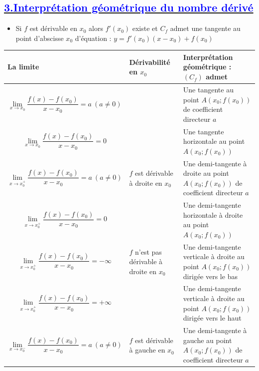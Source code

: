 \documentclass{article}
\begin{document}
\subsection*{\underline{\textbf{\textcolor{blue}{3.Interprétation géométrique du nombre dérivé}}}}
\begin{itemize}
		\item[•] Si \( f \) est dérivable en \( x_{0} \) alors \( f'(x_{0}) \) existe et \( C_{f} \) admet une tangente au point d’abscisse \( x_{0} \) d'équation : \( y=f'(x_{0})(x-x_{0}) + f(x_{0}) \)
\end{itemize}
\begin{table}[H]
\centering
\renewcommand{\arraystretch}{1.5}
\begin{tabular}{|>{\centering\arraybackslash}m{5cm}|>{\centering\arraybackslash}m{3cm}|>{\centering\arraybackslash}m{6cm}|}
\hline
\textbf{La limite} & \textbf{Dérivabilité en \( x_0 \)} & \textbf{Interprétation géométrique : \( (C_f) \) admet} \\
\hline
\[\lim_{x \to x_0} \frac{f(x) - f(x_0)}{x - x_0} = a \ (a \neq 0)\] & \multirow{2}{*}{\(f\) est dérivable en \(x_0\)} & Une tangente au point \( A \left(x_0; f(x_0)\right) \) de coefficient directeur \(a\) \\
\cline{1-1} \cline{3-3}
\[\lim_{x \to x_0} \frac{f(x) - f(x_0)}{x - x_0} = 0 \] &  & Une tangente horizontale au point \( A \left(x_0; f(x_0)\right) \) \\
\hline
\[\lim_{x \to x_0^+} \frac{f(x) - f(x_0)}{x - x_0} = a \ (a \neq 0) \] & \(f\) est dérivable à droite en \(x_0\) & Une demi-tangente à droite au point \( A \left(x_0; f(x_0)\right) \) de coefficient directeur \(a\) \\
\cline{1-1} \cline{3-3} 
\[\lim_{x \to x_0^+} \frac{f(x) - f(x_0)}{x - x_0} = 0 \] &  & Une demi-tangente horizontale à droite au point \( A \left(x_0; f(x_0)\right) \) \\
\hline
\[\lim_{x \to x_0^+} \frac{f(x) - f(x_0)}{x - x_0} = -\infty \] & \(f\) n'est pas dérivable à droite en \(x_0\) & Une demi-tangente verticale à droite au point \( A \left(x_0; f(x_0)\right) \) dirigée vers le bas \\
\cline{1-1} \cline{3-3}
\[\lim_{x \to x_0^+} \frac{f(x) - f(x_0)}{x - x_0} = +\infty \] &  & Une demi-tangente verticale à droite au point \( A \left(x_0; f(x_0)\right) \) dirigée vers le haut \\
\hline
\[\lim_{x \to x_0^-} \frac{f(x) - f(x_0)}{x - x_0} = a \ (a \neq 0) \] & \(f\) est dérivable à gauche en \(x_0\) & Une demi-tangente à gauche au point \( A \left(x_0; f(x_0)\right) \) de coefficient directeur \(a\) \\

\end{tabular}
\end{table}
\end{document}
